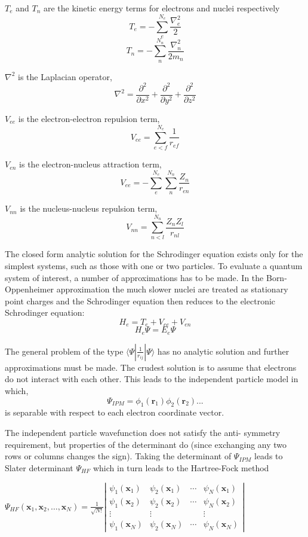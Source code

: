 \documentclass[12pt]{book} \usepackage[margin=1in]{geometry}
\newcommand{\bra}[1]{\langle #1|}
\newcommand{\ket}[1]{|#1\rangle}
\begin{document}
$T_{e}$ and $T_{n}$ are the kinetic energy terms for electrons
and nuclei respectively
$$T_{e} = -\sum_e^{N_e} \frac{\nabla^2_e}{2} $$
$$T_{n} = -\sum_n^{N_n} \frac{\nabla^2_n}{2m_n} $$

$\nabla^2$ is the Laplacian operator,
$$\nabla^2 = \frac{\partial^2}{\partial x^2}  +
\frac{\partial^2}{\partial y^2} +
\frac{\partial^2}{\partial z^2}$$

$V_{ee}$ is the electron-electron repulsion term,
$$V_{ee} = \sum_{e < f}^{N_e} \frac{1}{r_{ef}}$$

$V_{en}$ is the electron-nucleus attraction term,
$$V_{ee} = -\sum_{e}^{N_e} \sum_n^{N_n} \frac{Z_n}{r_{en}}$$

$V_{nn}$ is the nucleus-nucleus repulsion term,
$$V_{nn} = \sum_{n < l}^{N_n} \frac{Z_n Z_l}{r_{nl}}$$



The closed form analytic solution for the Schrodinger equation
exists only for the simplest systems, such as those with one or two
particles.  To evaluate a quantum system of interest, a number of
approximations has to be made.  In the Born-Oppenheimer approximation
\cite{born1927quantentheorie} the much slower nuclei are treated as
stationary point charges and the Schrodinger equation then reduces to
the electronic Schrodinger equation:
$$H_e = T_e + V_{ee} + V_{en}$$
$$ H_e\Psi = E_e\Psi$$

The general problem of the type $\bra{\Psi} \frac{1}{r_{ij}} \ket{\Psi}$
has no analytic solution and further approximations must be made.  The
crudest solution is to assume that electrons do not interact with each
other. This leads to the independent particle model in which,
$$\Psi_{IPM} = \phi_1(\mathbf{r}_1)\phi_2(\mathbf{r}_2)...$$
is separable with respect to each electron coordinate vector.

The independent particle wavefunction does not satisfy the anti-
symmetry requirement, but properties of the determinant do (since
exchanging any two rows or columns changes the sign).
Taking the determinant of $\Psi_{IPM}$ leads to Slater
determinant $\Psi_{HF}$ which in turn leads to the Hartree-Fock method

$ \Psi_{HF}(\mathbf{x}_1, \mathbf{x}_2, \ldots, \mathbf{x}_N) =
\frac{1}{\sqrt{N!}} \left|
\begin{matrix}
    \psi_1(\mathbf{x}_1) & \psi_2(\mathbf{x}_1) & \cdots &
    \psi_N(\mathbf{x}_1) \\
    \psi_1(\mathbf{x}_2) & \psi_2(\mathbf{x}_2) & \cdots &
    \psi_N(\mathbf{x}_2) \\
    \vdots               & \vdots               &        & \vdots
    \\
    \psi_1(\mathbf{x}_N) & \psi_2(\mathbf{x}_N) & \cdots &
    \psi_N(\mathbf{x}_N)
\end{matrix} \right| $
\end{document}
